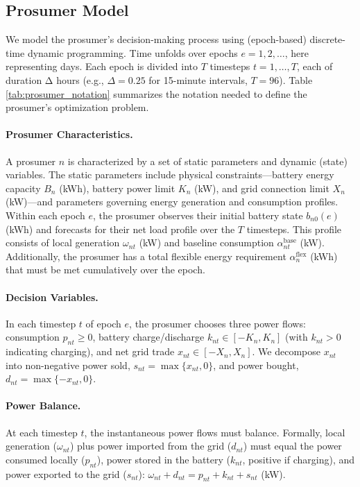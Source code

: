 \documentclass[12pt, notitlepage]{article}
\begin{document}
\subsection{Prosumer Model}

We model the prosumer's decision-making process using (epoch-based) discrete-time dynamic programming. Time unfolds over epochs $e=1, 2, \dots$, here representing days. Each epoch is divided into $T$ timesteps $t=1, \dots, T$, each of duration $\mathrm{\Delta}$ hours (e.g., $\Delta=0.25$ for 15-minute intervals, $T=96$). Table \ref{tab:prosumer_notation} summarizes the notation needed to define the prosumer's optimization problem.

\paragraph{Prosumer Characteristics.}
A prosumer $n$ is characterized by a set of static parameters and dynamic (state) variables. The static parameters include physical constraints—battery energy capacity $B_n$ (kWh), battery power limit $K_n$ (kW), and grid connection limit $X_n$ (kW)—and parameters governing energy generation and consumption profiles. Within each epoch $e$, the prosumer observes their initial battery state $b_{n0}(e)$ (kWh) and forecasts for their net load profile over the $T$ timesteps. This profile consists of local generation $\omega_{nt}$ (kW) and baseline consumption $\alpha^{\text{base}}_{nt}$ (kW). Additionally, the prosumer has a total flexible energy requirement $\alpha^{\text{flex}}_{n}$ (kWh) that must be met cumulatively over the epoch.

\paragraph{Decision Variables.}
In each timestep $t$ of epoch $e$, the prosumer chooses three power flows: consumption $p_{nt} \ge 0$, battery charge/discharge $k_{nt} \in [-K_n, K_n]$ (with $k_{nt}>0$ indicating charging), and net grid trade $x_{nt} \in [-X_n, X_n]$. We decompose $x_{nt}$ into non-negative power sold, $s_{nt} = \max\{x_{nt}, 0\}$, and power bought, $d_{nt} = \max\{-x_{nt}, 0\}$.

\paragraph{Power Balance.}
At each timestep $t$, the instantaneous power flows must balance. Formally,  local generation ($\omega_{nt}$) plus power imported from the grid ($d_{nt}$) must equal the power consumed locally ($p_{nt}$), power stored in the battery ($k_{nt}$, positive if charging), and power exported to the grid ($s_{nt}$): $\omega_{nt} + d_{nt} = p_{nt} + k_{nt} + s_{nt}$ (kW).
\end{document}
